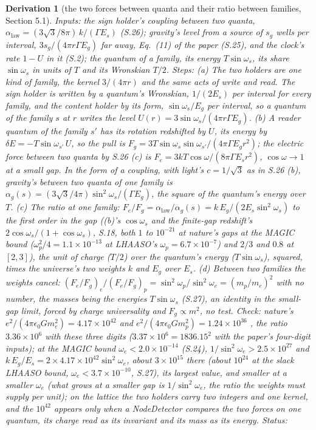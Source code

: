 \documentclass[pdflatex,sn-mathphys-num]{sn-jnl}
\theoremstyle{thmstyleone}
\newtheorem{derivation}{Derivation}
\begin{document}
\begin{derivation}[the two forces between quanta and their ratio between families, Section 5.1]
\emph{Inputs:} the sign holder's coupling between two quanta, $\alpha_{\mathrm{law}} = (3\sqrt 3 / 8\pi)\,k / (\Gamma E_s)$ (S.26); gravity's level from a source of $s_g$ wells per interval, $3s_g / (4\pi r\Gamma E_g)$ far away, Eq.~(11) of the paper (S.25), and the clock's rate $1 - U$ in it (S.2); the quantum of a family, its energy $T\sin\omega_s$, its share $\sin\omega_s$ in units of $T$ and its Wronskian $T / 2$. \emph{Steps:} (a) The two holders are one kind of family, the kernel $3 / (4\pi r)$ and the same acts of write and read. The sign holder is written by a quantum's Wronskian, $1 / (2E_s)$ per interval for every family, and the content holder by its form, $\sin\omega_s / E_g$ per interval, so a quantum of the family $s$ at $r$ writes the level $U(r) = 3\sin\omega_s / (4\pi r\Gamma E_g)$. (b) A reader quantum of the family $s'$ has its rotation redshifted by $U$, its energy by $\delta E = -T\sin\omega_{s'}\,U$, so the pull is $F_g = 3T\sin\omega_s\sin\omega_{s'} / (4\pi\Gamma E_g r^2)$; the electric force between two quanta by S.26 (c) is $F_e = 3kT\cos\omega / (8\pi\Gamma E_s r^2)$, $\cos\omega \to 1$ at a small gap. In the form of a coupling, with light's $c = 1 / \sqrt 3$ as in S.26 (b), gravity's between two quanta of one family is $\alpha_g(s) = (3\sqrt 3 / 4\pi)\sin^2\omega_s / (\Gamma E_g)$, the square of the quantum's energy over $T$. (c) The ratio at one family: $F_e / F_g = \alpha_{\mathrm{law}} / \alpha_g(s) = k\,E_g / (2E_s\sin^2\omega_s)$ to the first order in the gap ((b)'s $\cos\omega_s$ and the finite-gap redshift's $2\cos\omega_s / (1 + \cos\omega_s)$, S.18, both $1$ to $10^{-21}$ at nature's gaps at the MAGIC bound ($\omega_p^2 / 4 = 1.1 \times 10^{-13}$ at LHAASO's $\omega_p = 6.7 \times 10^{-7}$) and $2 / 3$ and $0.8$ at $[2, 3]$), the unit of charge ($T / 2$) over the quantum's energy ($T\sin\omega_s$), squared, times the universe's two weights $k$ and $E_g$ over $E_s$. (d) Between two families the weights cancel: $(F_e / F_g)_e / (F_e / F_g)_p = \sin^2\omega_p / \sin^2\omega_e = (m_p / m_e)^2$ with no number, the masses being the energies $T\sin\omega_s$ (S.27), an identity in the small-gap limit, forced by charge universality and $F_g \propto m^2$, no test. \emph{Check:} nature's $e^2 / (4\pi\epsilon_0 G m_e^2) = 4.17 \times 10^{42}$ and $e^2 / (4\pi\epsilon_0 G m_p^2) = 1.24 \times 10^{36}$ \cite{codata}, the ratio $3.36 \times 10^6$ with these three digits ($3.37 \times 10^6 = 1836.15^2$ with the paper's four-digit inputs); at the MAGIC bound $\omega_e < 2.0 \times 10^{-14}$ (S.24), $1 / \sin^2\omega_e > 2.5 \times 10^{27}$ and $k\,E_g / E_s = 2 \times 4.17 \times 10^{42}\sin^2\omega_e$, about $3 \times 10^{15}$ there (about $10^{24}$ at the slack LHAASO bound, $\omega_e < 3.7 \times 10^{-10}$, S.27), its largest value, and smaller at a smaller $\omega_e$ (what grows at a smaller gap is $1 / \sin^2\omega_e$, the ratio the weights must supply per unit); on the lattice the two holders carry two integers and one kernel, and the $10^{42}$ appears only when a NodeDetector compares the two forces on one quantum, its charge read as its invariant and its mass as its energy. \emph{Status:} 
\end{derivation}
\end{document}
